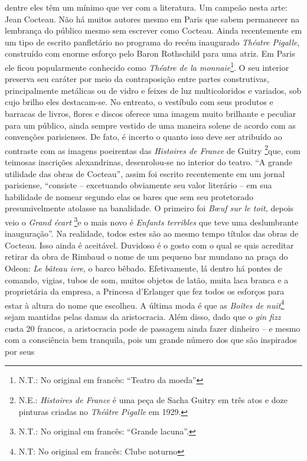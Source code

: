 dentre eles têm um mínimo que ver com a literatura. Um campeão nesta
arte: Jean Cocteau. Não há muitos autores mesmo em Paris que sabem
permanecer na lembrança do público mesmo sem escrever como Cocteau.
Ainda recentemente em um tipo de escrito panfletário no programa do
recém inaugurado \emph{Théatre Pigalle}, construído com enorme esforço
pelo Baron Rothschild para uma atriz. Em Paris ele ficou popularmente
conhecido como \emph{Théatre de la monnaie}\footnote{N.T.: No original
  em francês: ``Teatro da moeda''}. O seu interior preserva seu caráter
por meio da contraposição entre partes construtivas, principalmente
metálicas ou de vidro e feixes de luz multicoloridos e variados, sob
cujo brilho eles destacam-se. No entreato, o vestíbulo com seus produtos
e barracas de livros, flores e discos oferece uma imagem muito brilhante
e peculiar para um público, ainda sempre vestido de uma maneira solene
de acordo com as convenções parisienses. De fato, é incerto o quanto
isso deve ser atribuído ao contraste com as imagens poeirentas das
\emph{Histoires de France} de Guitry \footnote{N.E.: \emph{Histoires de
  France} é uma peça de Sacha Guitry em três atos e doze pinturas
  criadas no \emph{Théâtre Pigalle} em 1929.}que, com teimosas
inscrições alexandrinas, desenrolou-se no interior do teatro. ``A grande
utilidade das obras de Cocteau'', assim foi escrito recentemente em um
jornal parisiense, ``consiste -- excetuando obviamente seu valor
literário -- em sua habilidade de nomear segundo elas os bares que sem
seu protetorado presumivelmente atolasse na banalidade. O primeiro foi
\emph{Bœuf sur le toit,} depois veio o \emph{Grand écart} \footnote{N.T.:
  No original em francês: ``Grande lacuna''.}e o mais novo é
\emph{Enfants terribles} que teve uma deslumbrante inauguração''. Na
realidade, todos estes são ao mesmo tempo títulos das obras de Cocteau.
Isso ainda é aceitável. Duvidoso é o gosto com o qual se quis acreditar
retirar da obra de Rimbaud o nome de um pequeno bar mundano na praça do
Odeon: \emph{Le bâteau ivre}, o barco bêbado. Efetivamente, lá dentro há
pontes de comando, vigias, tubos de som, muitos objetos de latão, muita
laca branca e a proprietária da empresa, a Princesa d'Erlanger que fez
todos os esforços para estar à altura do nome que escolheu. A última
moda é que as \emph{Boîtes de nuit}\footnote{N.T: No original em
  francês: Clube noturno} sejam mantidas pelas damas da aristocracia.
Além disso, dado que o \emph{gin fizz} custa 20 francos, a aristocracia
pode de passagem ainda fazer dinheiro -- e mesmo com a consciência bem
tranquila, pois um grande número dos que são inspirados por seus
